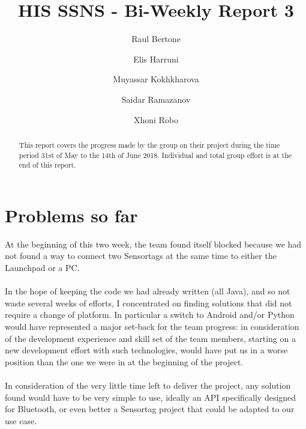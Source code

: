 \documentclass[12pt]{article}
\title{HIS SSNS - Bi-Weekly Report 3}
\author{
	 Raul Bertone
\and Elis Harruni
\and Muyassar Kokhkharova
\and Saidar Ramazanov
\and Xhoni Robo
}
\begin{document}
\maketitle

\begin{abstract}
 This report covers the progress made by the group on their project during the time period 31st of May to the 14th of June 2018. Individual and total group effort is at the end of this report.
\end{abstract}

\section{Problems so far}
At the beginning of this two week, the team found itself blocked because we had not found  a way to connect two Sensortags at the same time to either the Launchpad or a PC.\\\\
In the hope of keeping the code we had already written (all Java), and so not waste several weeks of efforts, I concentrated on finding solutions that did not require a change of platform. In particular a switch to Android and/or Python would have represented a major set-back for the team progress: in consideration of the development experience and skill set of the team members, starting on a new development effort with such technologies, would have put us in a worse position than the one we were in at the beginning of the project.\\\\
In consideration of the very little time left to deliver the project, any solution found would have to be very simple to use, ideally an API specifically designed for Bluetooth, or even better a Sensortag project that could be adapted to our use case.\\
\end{document}
